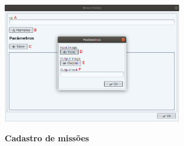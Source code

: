 \documentclass[
	12pt,				%
	oneside,			%
	a4paper,			%
	english,			%
	french,				%
	spanish,			%
	brazil,				%
	]{abntex2}
\begin{document}
\begin{figure}[H]
\centering
\caption{\textbf{Cadastro de missões}}
\includegraphics[width=0.7\textwidth]{imagens/visnode_cadastro_missao.png}
\sourceAuthor
\label{fig:visnodeCadastroMissoes}
\end{figure}
\end{document}
